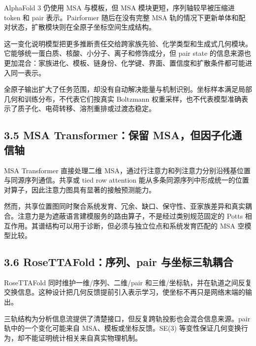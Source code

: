 \documentclass[10pt]{article}
\begin{document}

AlphaFold 3 仍使用 MSA 与模板，但 MSA 模块更短，序列轴较早被压缩进 token 和 pair 表示。Pairformer 随后在没有完整 MSA 轨的情况下更新单体和配对状态，扩散模块则在全原子坐标空间生成结构。\par

这一变化说明模型把更多推断责任交给跨家族先验、化学类型和生成式几何模块。它能够统一蛋白质、核酸、小分子、离子和修饰成分，但 pair state 的信息来源也更加混合：家族进化、模板、链身份、化学键、界面、置信度和扩散条件都可能进入同一表示。\par

全原子输出扩大了任务范围，却没有自动解决能量与机制识别。坐标样本满足局部几何和训练分布，不代表它们按真实 Boltzmann 权重采样，也不代表模型准确表示了质子化、电荷转移、溶剂重排或过渡态稳定。\par

\subsection*{3.5 MSA Transformer：保留 MSA，但因子化通信轴}


MSA Transformer 直接处理二维 MSA，通过行注意力和列注意力分别沿残基位置与同源序列通信。共享或 tied row attention 能从多条同源序列中形成统一的位置对算子，因此注意力图具有显著的接触预测能力。\par

然而，共享位置图同时聚合系统发育、冗余、缺口、保守性、亚家族差异和真实耦合。注意力是为遮蔽语言建模服务的路由算子，不是经过类别规范固定的 Potts 相互作用。其谱结构可以用于诊断，但必须与独立位点和系统发育匹配的 MSA 空模型比较。\par

\subsection*{3.6 RoseTTAFold：序列、pair 与坐标三轨耦合}


RoseTTAFold 同时维护一维/序列、二维/pair 和三维/坐标轨，并在轨道之间反复交换信息。这种设计把几何反馈提前引入表示学习，使坐标不再只是网络末端的输出。\par

三轨结构为分析信息流提供了清楚接口，但反复跨轨投影也会混合信息来源。pair 轨中的一个变化可能来自 MSA、模板或坐标反馈。SE(3) 等变性保证几何变换行为，却不能证明统计相关来自真实物理机制。\par
\end{document}
